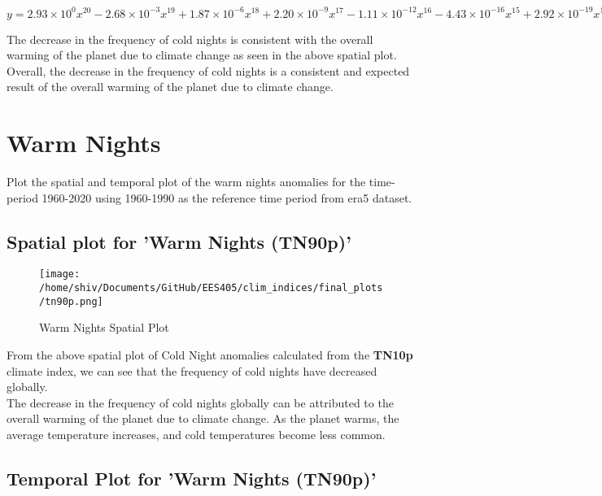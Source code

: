 \documentclass[a4paper, 12pt, twoside]{report}
\begin{document}
$y = 2.93\times10^{0} x^{20} -2.68\times10^{-3} x^{19} +1.87\times10^{-6} x^{18} +2.20\times10^{-9} x^{17} -1.11\times10^{-12} x^{16} -4.43\times10^{-16} x^{15} +2.92\times10^{-19} x^{14} -1.05\times10^{-24} x^{13} -2.91\times10^{-26} x^{12} +6.97\times10^{-30} x^{11} +2.79\times10^{-35} x^{10} -3.35\times10^{-37} x^{9} +8.48\times10^{-41} x^{8} -1.20\times10^{-44} x^{7} +1.14\times10^{-48} x^{6} -7.67\times10^{-53} x^{5} +3.67\times10^{-57} x^{4} -1.24\times10^{-61} x^{3} +2.79\times10^{-66} x^{2} -3.78\times10^{-71} x^{1} +2.34\times10^{-76}$

The decrease in the frequency of cold nights is consistent with the overall warming of the planet due to climate change as seen in the above spatial plot.\\
Overall, the decrease in the frequency of cold nights is a consistent and expected result of the overall warming of the planet due to climate change.

\section{Warm Nights}
Plot the spatial and temporal plot of the warm nights anomalies for the time-period 1960-2020 using 1960-1990 as the reference time period from era5 dataset.\\

\subsection{Spatial plot for 'Warm Nights (TN90p)'}
\begin{figure}[htb]
    \centering
    \texttt{[image: /home/shiv/Documents/GitHub/EES405/clim\_indices/final\_plots/tn90p.png]}
    \caption{Warm Nights Spatial Plot}
    \label{fig:warm_nights_spatial}
\end{figure}
From the above spatial plot of Cold Night anomalies calculated from the \textbf{TN10p} climate index, we can see that the frequency of cold nights have decreased globally.\\
The decrease in the frequency of cold nights globally can be attributed to the overall warming of the planet due to climate change. As the planet warms, the average temperature increases, and cold temperatures become less common.
\subsection{Temporal Plot  for 'Warm Nights (TN90p)'}
\end{document}

